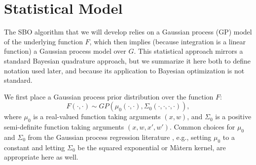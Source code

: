 \documentclass{article}
\newcommand{\w}{w}
\newcommand{\z}{z}
\newcommand{\pfcomment}[1]{{\color{red} PF: #1}}
\begin{document}







\section{Statistical Model}
\label{model}

The SBO algorithm that we will develop relies on a Gaussian process (GP) model of the underlying function $F$, which then implies (because integration is a linear function) a Gaussian process model over $G$.
This statistical approach mirrors a standard Bayesian quadrature approach, but we summarize it here both to define notation used later, and because its application to Bayesian optimization is not standard.

We first place a Gaussian process prior distribution over the function
$F$:
\[
F\left(\cdot,\cdot\right)\sim GP\left(\mu_{0}\left(\cdot,\cdot\right),\Sigma_{0}\left(\cdot,\cdot,\cdot,\cdot\right)\right),
\]
where $\mu_{0}$ is a real-valued function taking arguments $\left(x,\w\right)$, and $\Sigma_{0}$ is a positive semi-definite function taking arguments $\left(x,\w,x',\w'\right)$.
Common choices for $\mu_0$ and $\Sigma_0$ from the Gaussian process regression literature \cite{RaWi06,murphy2012machine},
e.g., setting $\mu_0$ to a constant and letting $\Sigma_0$ be the squared exponential or M\`{a}tern kernel, are appropriate here as well.
\end{document}
